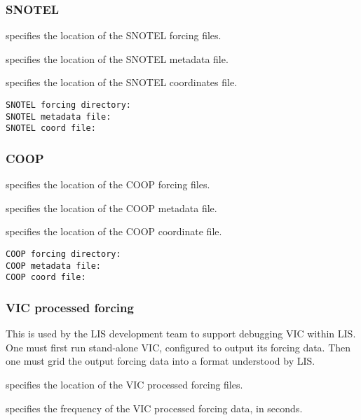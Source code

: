  
 \subsubsection{SNOTEL} \label{sssec:snotel}
 

 
  specifies the location of the
 SNOTEL forcing files.

  specifies the location of the SNOTEL
 metadata file.

  specifies the location of the SNOTEL
 coordinates file.
 

 \begin{Verbatim}[frame=single]
SNOTEL forcing directory:
SNOTEL metadata file:
SNOTEL coord file:
 \end{Verbatim}

 
 \subsubsection{COOP} \label{sssec:coop}
 

 
  specifies the location of the COOP
 forcing files.

  specifies the location of the COOP
 metadata file.

  specifies the location of the COOP
 coordinate file.
 

 \begin{Verbatim}[frame=single]
COOP forcing directory:
COOP metadata file:
COOP coord file:
 \end{Verbatim}

 
 \subsubsection{VIC processed forcing} \label{sssec:vicforcing}

 This is used by the LIS development team to support debugging VIC
 within LIS.  One must first run stand-alone VIC, configured to
 output its forcing data.  Then one must grid the output forcing
 data into a format understood by LIS.
 

 
  specifies the location of the VIC
 processed forcing files.

  specifies the frequency of the VIC
 processed forcing data, in seconds.


